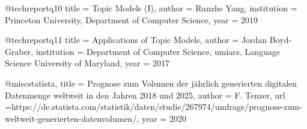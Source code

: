 \documentclass[german,version-2020-11]{uzl-thesis}
\begin{document}
\begin{bibtex-entries}
@techreport{q10
title = {Topic Models (I)},
author = {Runzhe Yang},
institution = {Princeton University, Department of Computer Science},
year = {2019}
}

@techreport{q11
title = {Applications of Topic Models},
author = {Jordan Boyd-Graber},
institution = {Department of Computer Science, umiacs, Language Science University of Maryland},
year = {2017}
}

@misc{statista,
title = {Prognose zum Volumen der jährlich generierten digitalen Datenmenge weltweit in den Jahren 2018 und 2025},
author = {F. Tenzer},
url ={https://de.statista.com/statistik/daten/studie/267974/umfrage/prognose-zum-weltweit-generierten-datenvolumen/},
year = {2020}
}



\end{bibtex-entries}


%
%
%
%
\end{document}
